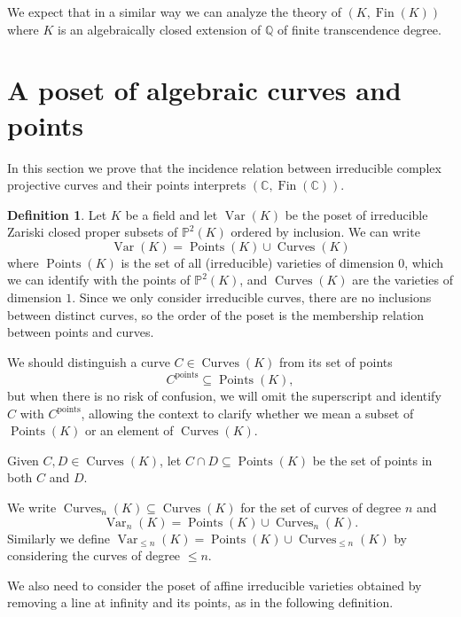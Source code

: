 \documentclass{amsart}
\newcommand{\C}{\mathbb C}
\newcommand{\Q}{\mathbb Q}
\newcommand{\Fin}{\operatorname{Fin}}
\theoremstyle{plain}
\theoremstyle{definition}
\newtheorem{defn}[thm]{Definition}
\newcommand{\Var}[1]{\operatorname{Var}(#1)}
\newcommand{\nVar}[2]{\operatorname{Var}_{#2} (#1)}
\newcommand{\Points}[1]{\operatorname{Points} (#1)}
\newcommand{\pt}[1]{{#1}^{\text{points}}}
\newcommand{\Curves}[1]{\operatorname{Curves}(#1)}
\newcommand{\nCurves}[2]{\operatorname{Curves}_{#2}(#1)}
\begin{document}
We expect that in a similar way we can analyze the theory of $(K, \Fin(K))$ where $K$ is an algebraically closed extension of $\Q$ of finite transcendence degree. 

\section{A poset of algebraic curves and points}\label{sec:poset}

In this section we prove that the incidence relation between irreducible complex projective curves and their points interprets $(\C, \Fin(\C))$. 

\begin{defn}
	Let $K$ be a field and let  $\Var K$ be the poset of irreducible Zariski closed proper subsets of $\mathbb{P}^2(K)$ ordered by inclusion. We can write 
	$$\Var K = \Points K \cup \Curves K$$ where $\Points K$ is the set of all (irreducible) varieties of dimension $0$, which we can identify with the points of $\mathbb P^2(K)$, and $\Curves K$ are the varieties of dimension $1$. Since we only consider irreducible curves, there are no inclusions between distinct curves, so the order of the poset is the membership relation between points and curves. 

 We should distinguish a curve $C\in \Curves K$ from its set of points 
 $$\pt C \subseteq \Points K,$$
  but when there is no risk of confusion, we will omit the superscript and identify \( C \) with \( \pt C \), allowing the context to clarify whether we mean a subset of $\Points K$  or an element of $\Curves K$. 
 
 Given $C,D\in \Curves K$, let  $C\cap D\subseteq \Points K$ be the set of points in both $C$ and $D$. 
	
	  We write $\nCurves K n\subseteq \Curves K$  for the set of curves of degree $n$ and 
%	  
$$\nVar K n = \Points K \cup \nCurves K n.$$
%
Similarly we define $\nVar K {\leq n} = \Points K \cup \nCurves K {\leq n}$ by considering the curves of degree $\leq n$. 
\end{defn}

We also need to consider the poset of affine irreducible varieties obtained by removing a line at infinity and its points, as in the following definition. 
\end{document}
